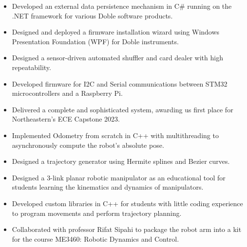 \documentclass[10pt,a4paper,ragged2e,withhyper]{altacv}
\begin{document}
    \begin{itemize}
        \item Developed an external data persistence mechanism in C\# running on the .NET framework for various Doble software products.
        \item Designed and deployed a firmware installation wizard using Windows Presentation Foundation (WPF) for Doble instruments.
    \end{itemize}
    \vspace{-1.45em}
    \begin{itemize}
        \item Designed a sensor-driven automated shuffler and card dealer with high repeatability.
        \item Developed firmware for I2C and Serial communications between STM32 microcontrollers and a Raspberry Pi.
        \item Delivered a complete and sophisticated system, awarding us first place for Northeastern's ECE Capstone 2023.
    \end{itemize}
    \begin{itemize}
        \item Implemented Odometry from scratch in C++ with multithreading to asynchronously compute the robot's absolute pose.
        \item Designed a trajectory generator using Hermite splines and Bezier curves.
    \end{itemize}
    \begin{itemize}
        \item Designed a 3-link planar robotic manipulator as an educational tool for students learning the kinematics and dynamics of manipulators.
        \item Developed custom libraries in C++ for students with little coding experience to program movements and perform trajectory planning.
        \item Collaborated with professor Rifat Sipahi to package the robot arm into a kit for the course ME3460: Robotic Dynamics and Control.
    \end{itemize}
\end{document}

